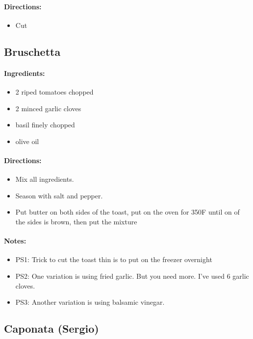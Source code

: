 \documentclass{article}
\begin{document}
\paragraph{Directions:}
\begin{itemize}
	\item Cut
\end{itemize}

\subsection{Bruschetta}

\paragraph{Ingredients:}

\begin{itemize}
	\item 2 riped tomatoes chopped
	\item 2 minced garlic cloves
	\item basil finely chopped
	\item olive oil
\end{itemize}

\paragraph{Directions:}
\begin{itemize}
	\item Mix all ingredients.
	\item Season with salt and pepper.
	\item Put butter on both sides of the toast, put on the oven for 350F until on of the sides is brown, then put the mixture
\end{itemize}

\paragraph{Notes:}
\begin{itemize}
	\item PS1: Trick to cut the toast thin is to put on the freezer overnight
	\item PS2: One variation is using fried garlic. But you need more. I've used 6 garlic cloves.
	\item PS3: Another variation is using balsamic vinegar.
\end{itemize}

\subsection{Caponata (Sergio)}
\end{document}
